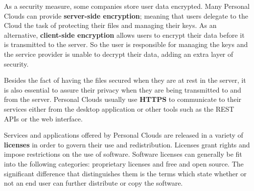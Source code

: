 As a security measure, some companies store user data encrypted. Many Personal Clouds can provide \textbf{server-side encryption}; meaning that users delegate to the Cloud the task of protecting their files and managing their keys. As an alternative, \textbf{client-side encryption} allows users to encrypt their data before it is transmitted to the server. So the user is responsible for managing the keys and the service provider is unable to decrypt their data, adding an extra layer of security.

Besides the fact of having the files secured when they are at rest in the server, it is also essential to assure their privacy when they are being transmitted to and from the server. Personal Clouds usually use \textbf{HTTPS} to communicate to their services either from the desktop application or other tools such as the REST APIs or the web interface.

Services and applications offered by Personal Clouds are released in a variety of \textbf{licenses} in order to govern their use and redistribution. Licenses grant rights and impose restrictions on the use of software. Software licenses can generally be fit into the following categories: proprietary licenses and free and open source. The significant difference that distinguishes them is the terms which state whether or not an end user can further distribute or copy the software.


